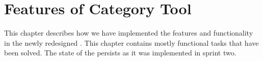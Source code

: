 
\chapter{Features of Category Tool}

This chapter describes how we have implemented the features and functionality in the newly redesigned \ct. This chapter contains mostly functional tasks that have been solved. The state of the \ct persists as it was implemented in sprint two.
















